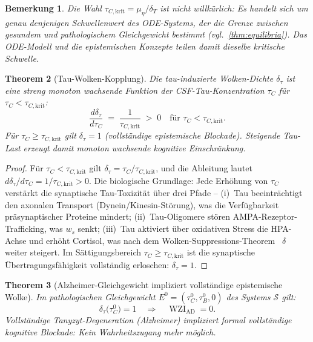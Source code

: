 ﻿\documentclass[12pt,a4paper]{article}
\newtheorem{theorem}{Theorem}[section]
\newtheorem{remark}[theorem]{Bemerkung}
\theoremstyle{definition}
\DeclareMathOperator{\WZI}{WZI}
\begin{document}
	\begin{remark}
		Die Wahl $\tau_{C,\mathrm{krit}} = \mu_\eta/\delta_T$ ist nicht willkürlich: Es handelt
		sich um genau denjenigen Schwellenwert des ODE-Systems, der die Grenze zwischen
		gesundem und pathologischem Gleichgewicht bestimmt (vgl.\ \cref{thm:equilibria}). Das
		ODE-Modell und die epistemischen Konzepte teilen damit dieselbe kritische Schwelle.
	\end{remark}

	\begin{theorem}[Tau-Wolken-Kopplung]
		\label{thm:taucloud}
		Die tau-induzierte Wolken-Dichte $\delta_\tau$ ist eine streng monoton wachsende
		Funktion der CSF-Tau-Konzentration $\tau_C$ für $\tau_C < \tau_{C,\mathrm{krit}}$:
		\[
			\frac{d\delta_\tau}{d\tau_C} \;=\; \frac{1}{\tau_{C,\mathrm{krit}}} \;>\; 0
			\quad\text{für }\tau_C < \tau_{C,\mathrm{krit}}.
		\]
		Für $\tau_C \geq \tau_{C,\mathrm{krit}}$ gilt $\delta_\tau = 1$ (vollständige
		epistemische Blockade). Steigende Tau-Last erzeugt damit monoton wachsende
		kognitive Einschränkung.
	\end{theorem}

	\begin{proof}
		Für $\tau_C < \tau_{C,\mathrm{krit}}$ gilt $\delta_\tau = \tau_C/\tau_{C,\mathrm{krit}}$,
		und die Ableitung lautet $d\delta_\tau/d\tau_C = 1/\tau_{C,\mathrm{krit}} > 0$.
		Die biologische Grundlage: Jede Erhöhung von $\tau_C$ verstärkt die synaptische
		Tau-Toxizität über drei Pfade -- (i)~Tau beeinträchtigt den axonalen Transport
		(Dynein/Kinesin-Störung), was die Verfügbarkeit präsynaptischer Proteine mindert;
		(ii)~Tau-Oligomere stören AMPA-Rezeptor-Trafficking, was $w_s$ senkt;
		(iii)~Tau aktiviert über oxidativen Stress die HPA-Achse und erhöht Cortisol, was
		nach dem Wolken-Suppressions-Theorem~\cite{Epp2026brn} $\delta$ weiter steigert.
		Im Sättigungsbereich $\tau_C \geq \tau_{C,\mathrm{krit}}$ ist die synaptische
		Übertragungsfähigkeit vollständig erloschen: $\delta_\tau = 1$.
	\end{proof}

	\begin{theorem}[Alzheimer-Gleichgewicht impliziert vollständige epistemische Wolke]
		\label{thm:alz_wolke}
		Im pathologischen Gleichgewicht $E^0 = (\tau_C^0, \tau_B^0, 0)$ des Systems
		$\mathcal{S}$ gilt:
		\[
			\delta_\tau\bigl(\tau_C^0\bigr) = 1
			\quad\Rightarrow\quad
			\WZI_{\mathrm{AD}} = 0.
		\]
		Vollständige Tanyzyt-Degeneration (Alzheimer) impliziert formal vollständige
		kognitive Blockade: Kein Wahrheitszugang mehr möglich.
	\end{theorem}
\end{document}
